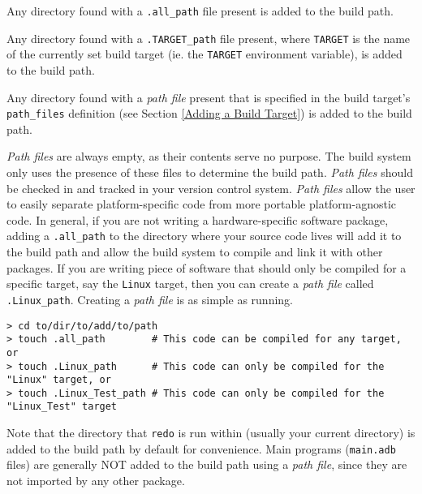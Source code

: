 \vspace{5mm} %
\begin{spacedenumerate}
  \item Any directory found with a \texttt{.all\_path} file present is added to the build path.
  \item Any directory found with a \texttt{.TARGET\_path} file present, where \texttt{TARGET} is the name of the currently set build target (ie. the \texttt{TARGET} environment variable), is added to the build path.
  \item Any directory found with a \textit{path file} present that is specified in the build target's \texttt{path\_files} definition (see Section \ref{Adding a Build Target}) is added to the build path.
\end{spacedenumerate}
\vspace{5mm} %

\textit{Path files} are always empty, as their contents serve no purpose. The build system only uses the presence of these files to determine the build path. \textit{Path files} should be checked in and tracked in your version control system. \textit{Path files} allow the user to easily separate platform-specific code from more portable platform-agnostic code. In general, if you are not writing a hardware-specific software package, adding a \texttt{.all\_path} to the directory where your source code lives will add it to the build path and allow the build system to compile and link it with other packages. If you are writing piece of software that should only be compiled for a specific target, say the \texttt{Linux} target, then you can create a \textit{path file} called \texttt{.Linux\_path}. Creating a \textit{path file} is as simple as running.

\vspace{5mm} %
\begin{verbatim}
> cd to/dir/to/add/to/path
> touch .all_path        # This code can be compiled for any target, or
> touch .Linux_path      # This code can only be compiled for the "Linux" target, or
> touch .Linux_Test_path # This code can only be compiled for the "Linux_Test" target
\end{verbatim}
\vspace{5mm} %

Note that the directory that \texttt{redo} is run within (usually your current directory) is added to the build path by default for convenience. Main programs (\texttt{main.adb} files) are generally NOT added to the build path using a \textit{path file}, since they are not imported by any other package. \\

